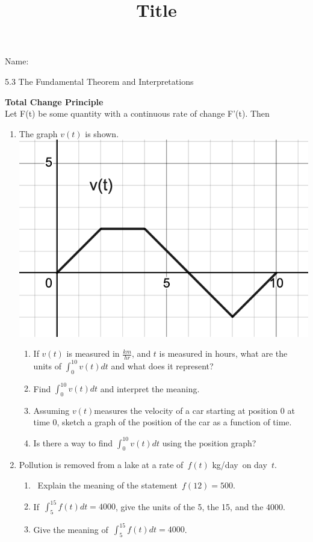 \documentclass[12pt]{article}
\title{Title}
\begin{document}

 Name:
 \begin{center}\large{5.3 The Fundamental Theorem and Interpretations}\end{center}

	\begin{tcolorbox}
	\textbf{Total Change Principle}\\
	Let F(t) be some quantity with a continuous rate of change F'(t). Then
	\vspace{10mm}
	\end{tcolorbox}


\begin{enumerate}
\item The graph $v(t)$ is shown.\\
	\includegraphics[scale=.3]{5_3_vt}
	\begin{enumerate}
	\item If $v(t)$ is measured in $\frac{km}{hr}$, and $t$ is measured in hours, what are the units of $\int_{0}^{10}v\left(t\right)dt$ and what does it represent?
	\vfill
	\item Find $\int_{0}^{10}v\left(t\right)dt$ and interpret the meaning.
	\vfill
	\item Assuming $v\left(t\right)$measures the velocity of a car starting at position 0 at time 0, sketch a graph of the position of the car as a function of time.
	\vfill
	\item Is there a way to find $\int_{0}^{10}v\left(t\right)dt$ using the position graph?
	\vfill
	\end{enumerate}
\item Pollution is removed from a lake at a rate of $f(t)$ kg/day on day $t$.
	\begin{enumerate}
	\item Explain the meaning of the statement $f(12) = 500$.
\vfill
	\item If $ \displaystyle \int_{5}^{15}f\left(t\right)dt=4000$, give the units of the 5, the 15, and the 4000.
\vfill
	\item Give the meaning of $ \displaystyle \int_{5}^{15}f\left(t\right)dt=4000$.
	\end{enumerate}
	\vfill


\end{enumerate}
\end{document}
